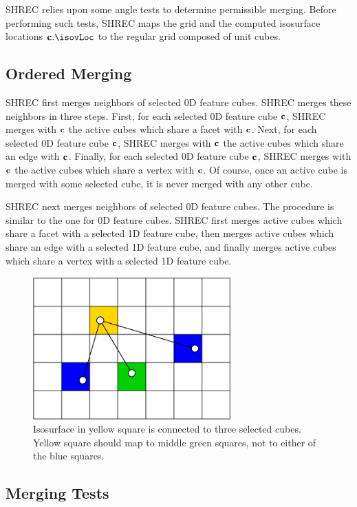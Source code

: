 SHREC relies upon some angle tests to determine permissible merging.
Before performing such tests, SHREC maps the grid 
and the computed isosurface locations $\cb.\isovLoc$
to the regular grid composed of unit cubes.

\subsection{Ordered Merging}
\label{section:ordered_merging}

SHREC first merges neighbors of selected 0D feature cubes.
SHREC merges these neighbors in three steps.
First, for each selected 0D feature cube $\mathbf{c}$,
SHREC merges with $\mathbf{c}$ the active cubes which share a facet with $\mathbf{c}$.
Next, for each selected 0D feature cube $\mathbf{c}$,
SHREC merges with $\mathbf{c}$ the active cubes which share an edge with $\mathbf{c}$.
Finally, for each selected 0D feature cube $\mathbf{c}$,
SHREC merges with $\mathbf{c}$ the active cubes which share a vertex with $\mathbf{c}$.
Of course, once an active cube is merged with some selected cube,
it is never merged with any other cube.

SHREC next merges neighbors of selected 0D feature cubes.
The procedure is similar to the one for 0D feature cubes.
SHREC first merges active cubes which share a facet with a selected 1D feature cube,
then merges active cubes which share an edge with a selected 1D feature cube,
and finally merges active cubes which share a vertex 
with a selected 1D feature cube.


\begin{figure}[t]
\centering

\includegraphics[width=3in]{images/connectedToIII.eps}

\caption{Isosurface in yellow square is connected to three selected cubes.
Yellow square should map to middle green squares, 
not to either of the blue squares.}
\label{fig:connectedToIII}
\end{figure}

\subsection{Merging Tests}
\label{section:merging_tests}

